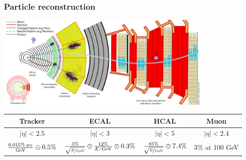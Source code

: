 \documentclass[aspectratio=169,xcolor=dvipsnames,,table,compress]{beamer}
\begin{document}
\begin{frame} \frametitle{Particle reconstruction}
  \vspace{-7mm}
  \centering 
  \includegraphics[width=0.8\textwidth]{../figures/talk/cms_transverse.png} \\ 
  \begin{tabular}{c|c|c|c}
    Tracker & ECAL & HCAL & Muon \\ 
     \hline 
     \hline 
     $|\eta|<2.5$ & $|\eta| <3$ & $|\eta|<5$ & $|\eta|<2.4$ \\ 
     $\frac{0.015\%\cdot p_\text{T}}{\mathrm{GeV}} \oplus 0.5\%$ &
     $\frac{3\%}{\sqrt{\nicefrac{E}{\mathrm{GeV}}}} \oplus \frac{12\%}{E/\mathrm{GeV}} \oplus 0.3\%$ & 
     $\frac{85\%}{\sqrt{\nicefrac{E}{\mathrm{GeV}}}} \oplus 7.4\%$ &
     $3\%$ at 100 GeV \\ 
  \end{tabular}
\end{frame}
\end{document}

